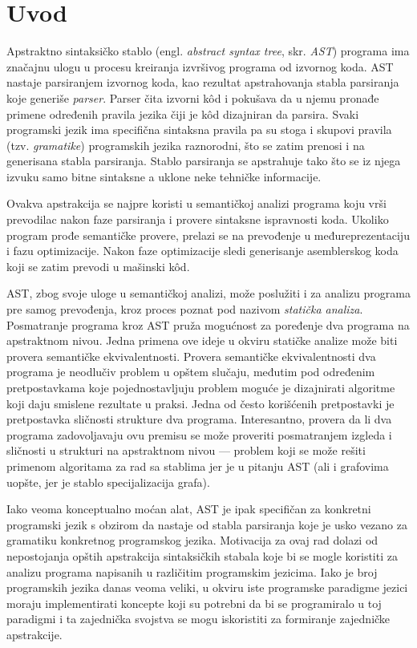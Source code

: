\chapter{Uvod}
\label{chp:Intro}

Apstraktno sintaksičko stablo (engl. \emph{abstract syntax tree}, skr. \emph{AST}) programa ima značajnu ulogu u procesu kreiranja izvršivog programa od izvornog koda. AST nastaje parsiranjem izvornog koda, kao rezultat apstrahovanja stabla parsiranja koje generiše \emph{parser}. Parser čita izvorni k\^od i pokušava da u njemu pronađe primene određenih pravila jezika čiji je k\^od dizajniran da parsira. Svaki programski jezik ima specifična sintaksna pravila pa su stoga i skupovi pravila (tzv. \emph{gramatike}) programskih jezika raznorodni, što se zatim prenosi i na generisana stabla parsiranja. Stablo parsiranja se apstrahuje tako što se iz njega izvuku samo bitne sintaksne a uklone neke tehničke informacije.

Ovakva apstrakcija se najpre koristi u semantičkoj analizi programa koju vrši prevodilac nakon faze parsiranja i provere sintaksne ispravnosti koda. Ukoliko program prođe semantičke provere, prelazi se na prevođenje u međureprezentaciju i fazu optimizacije. Nakon faze optimizacije sledi generisanje asemblerskog koda koji se zatim prevodi u mašinski k\^od.

AST, zbog svoje uloge u semantičkoj analizi, može poslužiti i za analizu programa pre samog prevođenja, kroz proces poznat pod nazivom \emph{statička analiza}. Posmatranje programa kroz AST pruža mogućnost za poređenje dva programa na apstraktnom nivou. Jedna primena ove ideje u okviru statičke analize može biti provera semantičke ekvivalentnosti. Provera semantičke ekvivalentnosti dva programa je neodlučiv problem u opštem slučaju, međutim pod određenim pretpostavkama koje pojednostavljuju problem moguće je dizajnirati algoritme koji daju smislene rezultate u praksi. Jedna od često korišćenih pretpostavki je pretpostavka sličnosti strukture dva programa. Interesantno, provera da li dva programa zadovoljavaju ovu premisu se može proveriti posmatranjem izgleda i sličnosti u strukturi na apstraktnom nivou --- problem koji se može rešiti primenom algoritama za rad sa stablima jer je u pitanju AST (ali i grafovima uopšte, jer je stablo specijalizacija grafa).

Iako veoma konceptualno moćan alat, AST je ipak specifičan za konkretni programski jezik s obzirom da nastaje od stabla parsiranja koje je usko vezano za gramatiku konkretnog programskog jezika. Motivacija za ovaj rad dolazi od nepostojanja opštih apstrakcija sintaksičkih stabala koje bi se mogle koristiti za analizu programa napisanih u različitim programskim jezicima. Iako je broj programskih jezika danas veoma veliki, u okviru iste programske paradigme jezici moraju implementirati koncepte koji su potrebni da bi se programiralo u toj paradigmi i ta zajednička svojstva se mogu iskoristiti za formiranje zajedničke apstrakcije. 

